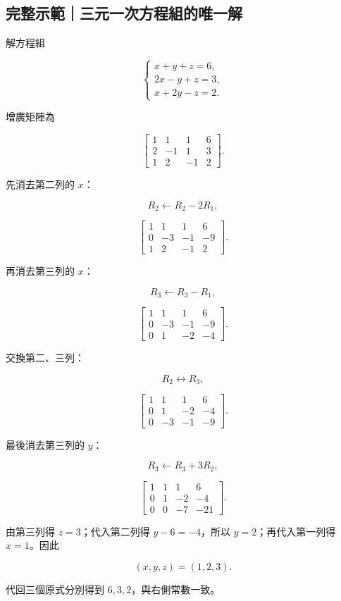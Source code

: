 \documentclass[11pt,a4paper]{article}
\begin{document}
\begin{HandoutWorkedExample}

\subsection{完整示範｜三元一次方程組的唯一解}\label{ux5b8cux6574ux793aux7bc4ux4e09ux5143ux4e00ux6b21ux65b9ux7a0bux7d44ux7684ux552fux4e00ux89e3}

解方程組

\[
\begin{cases}
x+y+z=6,\\
2x-y+z=3,\\
x+2y-z=2.
\end{cases}
\]

增廣矩陣為

\[
\left[
\begin{array}{ccc|c}
1&1&1&6\\
2&-1&1&3\\
1&2&-1&2
\end{array}
\right].
\]

先消去第二列的 \(x\)：

\[
R_2\leftarrow R_2-2R_1,
\]

\[
\left[
\begin{array}{ccc|c}
1&1&1&6\\
0&-3&-1&-9\\
1&2&-1&2
\end{array}
\right].
\]

\clearpage

再消去第三列的 \(x\)：

\[
R_3\leftarrow R_3-R_1,
\]

\[
\left[
\begin{array}{ccc|c}
1&1&1&6\\
0&-3&-1&-9\\
0&1&-2&-4
\end{array}
\right].
\]

交換第二、三列：

\[
R_2\leftrightarrow R_3,
\]

\[
\left[
\begin{array}{ccc|c}
1&1&1&6\\
0&1&-2&-4\\
0&-3&-1&-9
\end{array}
\right].
\]

最後消去第三列的 \(y\)：

\[
R_3\leftarrow R_3+3R_2,
\]

\[
\left[
\begin{array}{ccc|c}
1&1&1&6\\
0&1&-2&-4\\
0&0&-7&-21
\end{array}
\right].
\]

由第三列得 \(z=3\)；代入第二列得 \(y-6=-4\)，所以 \(y=2\)；再代入第一列得 \(x=1\)。因此

\[
\boxed{(x,y,z)=(1,2,3)}.
\]

代回三個原式分別得到 \(6,3,2\)，與右側常數一致。

\end{HandoutWorkedExample}
\end{document}
